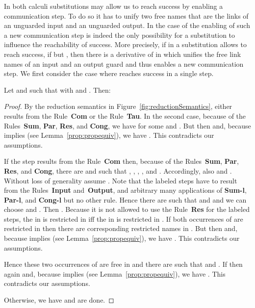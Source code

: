 \documentclass[]{article}
\begin{document}
In both calculi substitutions may allow us to reach success by enabling a communication step. To do so it has to unify two free names that are the links of an unguarded input and an unguarded output. In the case of \piNM the enabling of such a new communication step is indeed the only possibility for a substitution to influence the reachability of success.
More precisely, if in \piNM a substitution  allows to reach success, \ie if  but , then there is a derivative of  in which  unifies the free link names of an input and an output guard and thus enables a new communication step.
We first consider the case where  reaches success in a single step.

\begin{lemma}
	\label{lem:newCom}
	Let  and  such that  with  and . Then:
	
\end{lemma}

\begin{proof}
	By the reduction semantics in Figure~\ref{fig:reductionSemantics},  either results from the Rule~\textbf{Com} or the Rule~\textbf{Tau}. In the second case, because of the Rules~\textbf{Sum}, \textbf{Par}, \textbf{Res}, and \textbf{Cong}, we have  for some  and . But then  and, because  implies  (see Lemma~\ref{prop:propequiv}), we have . This contradicts our assumptions.
	
	If the step  results from the Rule~\textbf{Com} then, because of the Rules~\textbf{Sum}, \textbf{Par}, \textbf{Res}, and \textbf{Cong}, there are  and  such that , , , , and .
	Accordingly, also  and .
	Without loss of generality assume .
	Note that the labeled steps have to result from the Rules~\textbf{Input} and~\textbf{Output}, and arbitrary many applications of \textbf{Sum-l}, \textbf{Par-l}, and \textbf{Cong-l} but no other rule. Hence there are  such that  and  and we can choose  and .
	Then . Because it is not allowed to use the Rule~\textbf{Res} for the labeled steps, the  in  is restricted in  iff the  in  is restricted in . If both occurrences of  are restricted in  then there are corresponding restricted names in . But then  and, because  implies  (see Lemma~\ref{prop:propequiv}), we have . This contradicts our assumptions.
	
	Hence these two occurrences of  are free in  and there are  such that  and . If  then again  and, because  implies  (see Lemma~\ref{prop:propequiv}), we have . This contradicts our assumptions.
	
	Otherwise, we have  and are done.
\end{proof}
\end{document}
